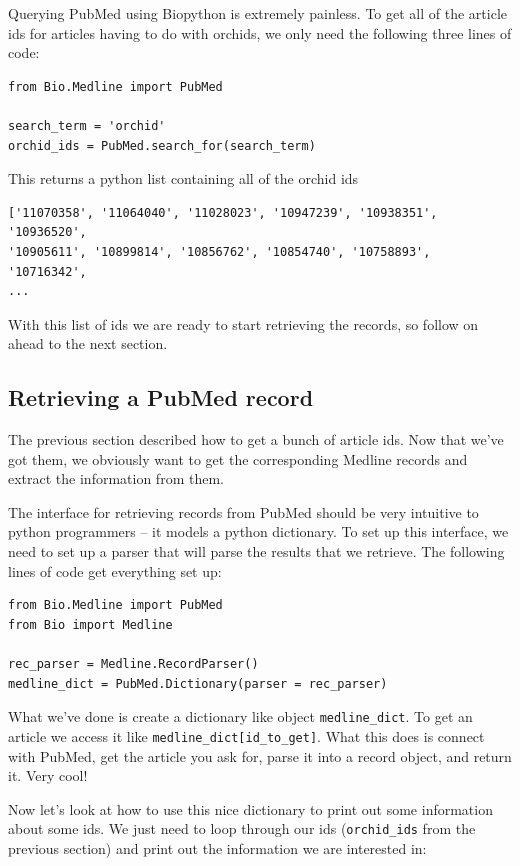 \documentclass{report}
\begin{document}
Querying PubMed using Biopython is extremely painless. To get all of the article ids for articles having to do with orchids, we only need the following three lines of code:

\begin{verbatim}
from Bio.Medline import PubMed

search_term = 'orchid'
orchid_ids = PubMed.search_for(search_term)
\end{verbatim}

This returns a python list containing all of the orchid ids

\begin{verbatim}
['11070358', '11064040', '11028023', '10947239', '10938351', '10936520', 
'10905611', '10899814', '10856762', '10854740', '10758893', '10716342', 
...
\end{verbatim}

With this list of ids we are ready to start retrieving the records, so follow on ahead to the next section.

\subsection{Retrieving a PubMed record}

The previous section described how to get a bunch of article ids. Now that we've got them, we obviously want to get the corresponding Medline records and extract the information from them. 


The interface for retrieving records from PubMed should be very intuitive to python programmers -- it models a python dictionary. To set up this interface, we need to set up a parser that will parse the results that we retrieve. The following lines of code get everything set up:

\begin{verbatim}
from Bio.Medline import PubMed
from Bio import Medline

rec_parser = Medline.RecordParser()
medline_dict = PubMed.Dictionary(parser = rec_parser)
\end{verbatim}

What we've done is create a dictionary like object \verb|medline_dict|. To get an article we access it like \verb|medline_dict[id_to_get]|. What this does is connect with PubMed, get the article you ask for, parse it into a record object, and return it. Very cool! 


Now let's look at how to use this nice dictionary to print out some information about some ids. We just need to loop through our ids (\verb|orchid_ids| from the previous section) and print out the information we are interested in:
\end{document}
